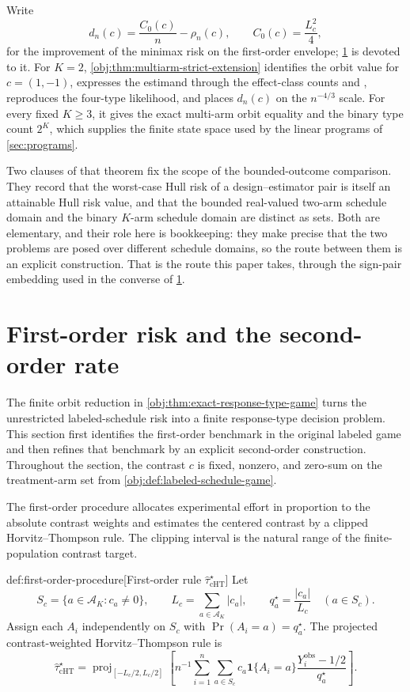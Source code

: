 \documentclass[11pt]{article}
\begin{document}
Write
\[
d_n(c)=\frac{C_0(c)}{n}-\rho_n(c),
\qquad
C_0(c)=\frac{L_c^2}{4},
\]
for the improvement of the minimax risk on the first-order envelope; \cref{sec:rates} is devoted to it. For \(K=2\), \cref{obj:thm:multiarm-strict-extension} identifies the orbit value for \(c=(1,-1)\), expresses the estimand through the effect-class counts  and , reproduces the four-type likelihood, and places \(d_n(c)\) on the \(n^{-4/3}\) scale. For every fixed \(K\ge3\), it gives the exact multi-arm orbit equality and the binary type count \(2^K\), which supplies the finite state space used by the linear programs of \cref{sec:programs}.

Two clauses of that theorem fix the scope of the bounded-outcome comparison. They record that the worst-case Hull risk of a design--estimator pair is itself an attainable Hull risk value, and that the bounded real-valued two-arm schedule domain and the binary \(K\)-arm schedule domain are distinct as sets. Both are elementary, and their role here is bookkeeping: they make precise that the two problems are posed over different schedule domains, so the route between them is an explicit construction. That is the route this paper takes, through the sign-pair embedding used in the converse of \cref{sec:rates}.


\section{First-order risk and the second-order rate}\label{sec:rates}

The finite orbit reduction in \cref{obj:thm:exact-response-type-game} turns the unrestricted labeled-schedule risk into a finite response-type decision problem. This section first identifies the first-order benchmark in the original labeled game and then refines that benchmark by an explicit second-order construction. Throughout the section, the contrast \(c\) is fixed, nonzero, and zero-sum on the treatment-arm set from \cref{obj:def:labeled-schedule-game}.

The first-order procedure allocates experimental effort in proportion to the absolute contrast weights and estimates the centered contrast by a clipped Horvitz--Thompson rule. The clipping interval is the natural range of the finite-population contrast target.

\begin{definitionv}{def:first-order-procedure}[First-order rule $\widehat\tau_{\mathrm{cHT}}^\star$]
Let
\[
S_c=\{a\in\mathcal A_K:c_a\ne 0\},\qquad
L_c=\sum_{a\in\mathcal A_K}|c_a|,\qquad
q_a^\star=\frac{|c_a|}{L_c}\quad(a\in S_c).
\]
Assign each \(A_i\) independently on \(S_c\) with \(\Pr(A_i=a)=q_a^\star\). The projected contrast-weighted Horvitz--Thompson rule is
\[
\widehat\tau_{\mathrm{cHT}}^\star
=
\operatorname{proj}_{[-L_c/2,L_c/2]}\!\left[
n^{-1}\sum_{i=1}^n\sum_{a\in S_c}
c_a\mathbf 1\{A_i=a\}\frac{Y_i^{\mathrm{obs}}-1/2}{q_a^\star}
\right].
\]
\end{definitionv}
\end{document}
